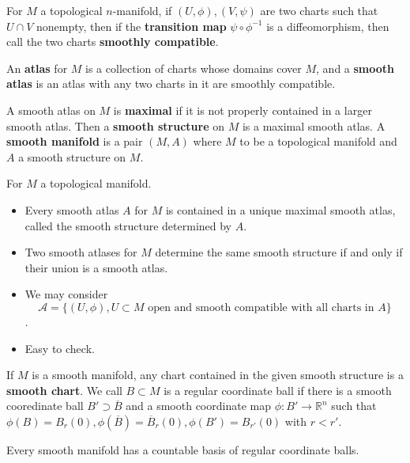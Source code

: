 \begin{definition}
    For $M$ a topological $n$-manifold, if $(U,\phi),(V,\psi)$ are two charts such that $U\cap V$ nonempty, then if the \textbf{transition map} $\psi \circ \phi^{-1}$ is a diffeomorphism, then call the two charts \textbf{smoothly compatible}.\par
    An \textbf{atlas} for $M$ is a collection of charts whose domains cover $M$, and a \textbf{smooth atlas} is an atlas with any two charts in it are smoothly compatible.\par
    A smooth atlas on $M$ is \textbf{maximal} if it is not properly contained in a larger smooth atlas. Then a \textbf{smooth structure} on $M$ is a maximal smooth atlas. A \textbf{smooth manifold} is a pair $(M,A)$ where $M$ to be a topological manifold and $A$ a smooth structure on $M$.
\end{definition}

\begin{proposition}
    For $M$ a topological manifold.
    \begin{itemize}
        \item Every smooth atlas $A$ for $M$ is contained in a unique maximal smooth atlas, called the smooth structure determined by $A$.\par
        \item Two smooth atlases for $M$ determine the same smooth structure if and only if their union is a smooth atlas.
    \end{itemize}
\end{proposition}
\Pf\par
    \begin{itemize}
    \item We may consider \[\mathcal{A} = \{(U,\phi), U \subset M \text{ open and smooth compatible with all charts in }A\}\].
    \item Easy to check.
    \end{itemize}

\begin{definition}
    If $M$ is a smooth manifold, any chart contained in the given smooth structure is a \textbf{smooth chart}. We call $B\subset M$ is a regular coordinate ball if there is a smooth cooredinate ball $B' \supset \overline{B}$ and a smooth coordinate map $\phi:B'\to \mathbb{R}^n$ such that $\phi(B) = B_r(0), \phi(\overline{B}) = \overline{B}_r(0), \phi(B') = B_{r'}(0)$ with $r<r'$.
\end{definition}

\begin{proposition}
    Every smooth manifold has a countable basis of regular coordinate balls.
\end{proposition}

